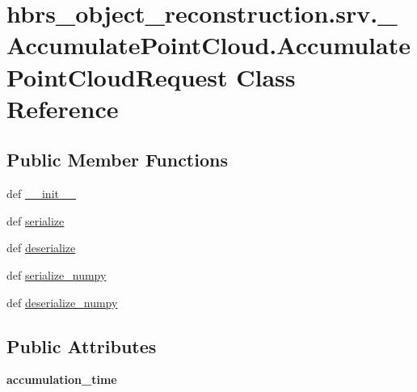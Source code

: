 \hypertarget{classhbrs__object__reconstruction_1_1srv_1_1___accumulate_point_cloud_1_1_accumulate_point_cloud_request}{\section{hbrs\-\_\-object\-\_\-reconstruction.\-srv.\-\_\-\-Accumulate\-Point\-Cloud.\-Accumulate\-Point\-Cloud\-Request \-Class \-Reference}
\label{classhbrs__object__reconstruction_1_1srv_1_1___accumulate_point_cloud_1_1_accumulate_point_cloud_request}
}
\subsection*{\-Public \-Member \-Functions}
\begin{DoxyCompactItemize}
\item 
def \hyperlink{classhbrs__object__reconstruction_1_1srv_1_1___accumulate_point_cloud_1_1_accumulate_point_cloud_request_acdb84860df47ccd592e50f369a4b215c}{\-\_\-\-\_\-init\-\_\-\-\_\-}
\item 
def \hyperlink{classhbrs__object__reconstruction_1_1srv_1_1___accumulate_point_cloud_1_1_accumulate_point_cloud_request_afdb6c2603f865f6dc67471e09a29eec8}{serialize}
\item 
def \hyperlink{classhbrs__object__reconstruction_1_1srv_1_1___accumulate_point_cloud_1_1_accumulate_point_cloud_request_a32d195e3fbb80ada6e96497137cc7780}{deserialize}
\item 
def \hyperlink{classhbrs__object__reconstruction_1_1srv_1_1___accumulate_point_cloud_1_1_accumulate_point_cloud_request_ab3eb36e67843bc6af1cf29edb35391e0}{serialize\-\_\-numpy}
\item 
def \hyperlink{classhbrs__object__reconstruction_1_1srv_1_1___accumulate_point_cloud_1_1_accumulate_point_cloud_request_a76b5784c008f7e399f05a3c3741bbbca}{deserialize\-\_\-numpy}
\end{DoxyCompactItemize}
\subsection*{\-Public \-Attributes}
\begin{DoxyCompactItemize}
\item 
\hypertarget{classhbrs__object__reconstruction_1_1srv_1_1___accumulate_point_cloud_1_1_accumulate_point_cloud_request_a60e0e04b8014df412828ceea80697774}{{\bfseries accumulation\-\_\-time}}\label{classhbrs__object__reconstruction_1_1srv_1_1___accumulate_point_cloud_1_1_accumulate_point_cloud_request_a60e0e04b8014df412828ceea80697774}

\end{DoxyCompactItemize}


